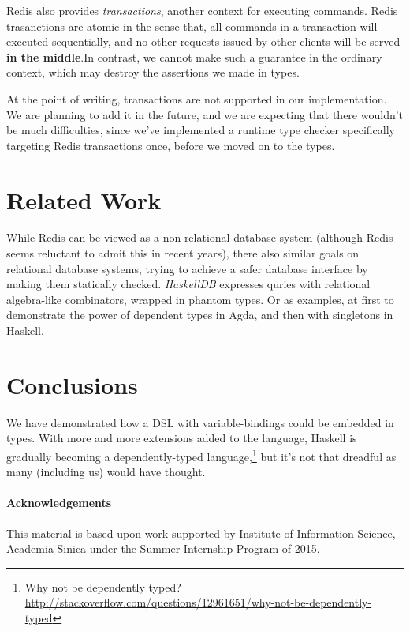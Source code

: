 \documentclass[pldi]{sigplanconf-pldi16}
\begin{document}
Redis also provides \emph{transactions}, another context for executing commands.
Redis trasanctions are atomic in the sense that, all commands in a transaction
 will executed sequentially, and no other requests issued by other clients will
 be served \textbf{in the middle}.\footnotemark In contrast, we cannot make such
 a guarantee in the ordinary context, which may destroy the assertions we made
 in types.

At the point of writing, transactions are not supported in our implementation.
 We are planning to add it in the future, and we are expecting that there
 wouldn't be much difficulties, since we've implemented a runtime type checker
 specifically targeting Redis transactions once, before we moved on to the
 types.

\section{Related Work}

While Redis can be viewed as a non-relational database system (although Redis
 seems reluctant to admit this in recent years), there also similar goals on
 relational database systems, trying to achieve a safer database interface by
 making them statically checked.
 \emph{HaskellDB}\cite{haskelldb}\cite{haskelldbimproved} expresses quries
 with relational algebra-like combinators, wrapped in phantom types. Or as
 examples, at first to demonstrate the power of dependent types in
 Agda\cite{pi}, and then with singletons in Haskell\cite{singletons}.

\section{Conclusions}

We have demonstrated how a DSL with variable-bindings could be embedded in types.
With more and more extensions added to the language, Haskell is gradually
 becoming a dependently-typed language,\footnote{Why not be dependently typed? \url{http://stackoverflow.com/questions/12961651/why-not-be-dependently-typed}}
 but it's not that dreadful as many (including us) would have thought.

\paragraph{Acknowledgements}
This material is based upon work supported by Institute of Information Science,
Academia Sinica under the Summer Internship Program of 2015.



\end{document}
